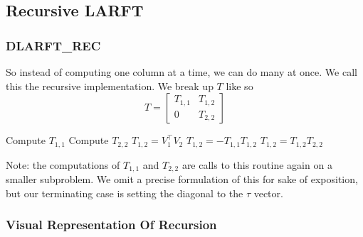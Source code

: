 \documentclass[12pt]{beamer}
\begin{document}
    \subsection{Recursive LARFT}
    \begin{frame}
        \frametitle{DLARFT\_REC}
        So instead of computing one column at a time, we can do many at once. We call this the recursive implementation.
        We break up $T$ like so
        $$
            T = \begin{bmatrix} T_{1,1} & T_{1,2} \\ 0 & T_{2,2} \end{bmatrix}
        $$
        \begin{algorithmic}[1]
            \State Compute $T_{1,1}$ 
            \State Compute $T_{2,2}$ 
            \State $T_{1,2} = V_1^\top V_2$
            \State $T_{1,2} = -T_{1,1}T_{1,2}$
            \State $T_{1,2} = T_{1,2}T_{2,2}$
        \end{algorithmic}
        Note: the computations of $T_{1,1}$ and $T_{2,2}$ are calls to this routine again on a smaller subproblem. 
        We omit a precise formulation of this for sake of exposition, but our terminating case is setting the diagonal
        to the $\tau$ vector.
    \end{frame}
    \begin{frame}
        \frametitle{Visual Representation Of Recursion}
    \end{frame}
\end{document}
